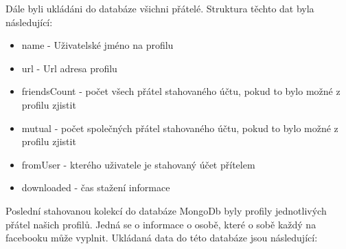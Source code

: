 \documentclass[thesis=M,czech]{FITthesis}[2013/05/10]
\begin{document}
Dále byli ukládáni do databáze všichni přátelé. Struktura těchto dat byla následující:

\begin{itemize}
  \item name - Uživatelské jméno na profilu
  \item url - Url adresa profilu
  \item friendsCount - počet všech přátel stahovaného účtu, pokud to bylo možné z profilu zjistit
  \item mutual - počet společných přátel stahovaného účtu, pokud to bylo možné z profilu zjistit
  \item fromUser - kterého uživatele je stahovaný účet přítelem
  \item downloaded - čas stažení informace
\end{itemize}

Poslední stahovanou kolekcí do databáze MongoDb byly profily jednotlivých přátel našich profilů. Jedná se o informace o osobě, které o sobě každý na facebooku může vyplnit. Ukládaná data do této databáze jsou následující:
\end{document}
